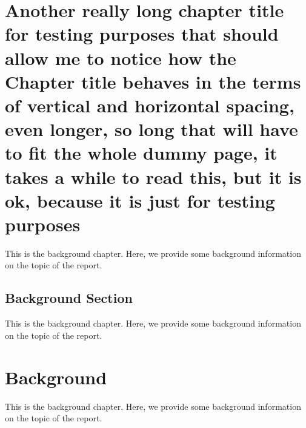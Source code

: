 \documentclass{report}
\begin{document}

\chapter{Another really long chapter title for testing purposes that should allow me to notice how the Chapter title behaves in the terms of vertical and horizontal spacing, even longer, so long that will have to fit the whole dummy page, it takes a while to read this, but it is ok, because it is just for testing purposes}
This is the background chapter. Here, we provide some background information on
the topic of the report.
\section{Background Section}

This is the background chapter. Here, we provide some background information on
the topic of the report.
\chapter{Background}
This is the background chapter. Here, we provide some background information on
the topic of the report.
\end{document}
